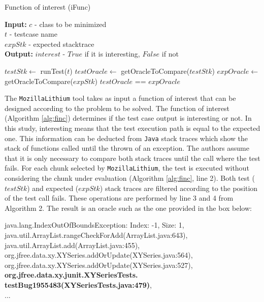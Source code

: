 \documentclass{article}
\begin{document}
\begin{algorithm}[h]
	\caption{Function of interest (iFunc)}
	\label{alg:finc}
	\begin{flushleft}
		\textbf{Input:} $c$ - class to be minimized\\
		\hspace{2.75em} $t$ - testcase name\\
		\hspace{2.75em} $expStk$ -  expected stacktrace\\
		\textbf{Output:} $interest$ - $True$ if it is interesting, $False$ if not \\
	\end{flushleft}
	\begin{algorithmic}[1]
		\State $testStk \leftarrow$ runTest($t$)
		\State $testOracle \leftarrow$ getOracleToCompare($testStk$)
		\State $expOracle \leftarrow$ getOracleToCompare($expStk$)
		\State \Return $testOracle$ == $expOracle$
		\EndFunction

	\end{algorithmic}

\end{algorithm}

The \texttt{MozillaLithium} tool takes as input a function of interest that can be designed according to the problem to be solved. The function of interest (Algorithm \ref{alg:finc}) determines if the test case output is interesting or not. In this study, interesting means that the test execution path is equal to the expected one. This information can be deducted from \texttt{Java} stack traces which show the stack of functions called until the thrown of an exception. The authors assume that it is only necessary to compare both stack traces until the call where the test fails. For each chunk selected by \texttt{MozillaLithium}, the test is executed without considering the chunk under evaluation (Algorithm \ref{alg:finc}, line 2). Both test ($testStk$) and expected ($expStk$) stack traces are filtered according to the position of the test call fails. These operations are performed by line 3 and 4 from Algorithm 2. The result is an oracle such as the one provided in the box below:


\vspace{3mm}
\begin{myframe} \label{box:1}
java.lang.IndexOutOfBoundsException: Index: -1, Size: 1,
java.util.ArrayList.rangeCheckForAdd(ArrayList.java:643),
java.util.ArrayList.add(ArrayList.java:455),
org.jfree.data.xy.XYSeries.addOrUpdate(XYSeries.java:564),
org.jfree.data.xy.XYSeries.addOrUpdate(XYSeries.java:527),
\textbf{org.jfree.data.xy.junit.XYSeriesTests.}\\
\textbf{testBug1955483(XYSeriesTests.java:479)},\\
...
\end{myframe}
\end{document}
